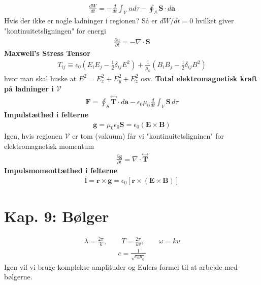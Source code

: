 \documentclass[a4paper]{article}
\begin{document}
    \begin{align*}
        \boxed{\frac{dW}{dt} = -\frac{d}{dt} \int _\mathcal{V} u d \tau  - \oint_{\mathcal{S} } \mathbf{S} \cdot d \mathbf{a}} \tag{8.11}
    \end{align*}
    Hvis der ikke er nogle ladninger i regionen? Så er \(dW / dt = 0\) hvilket giver "kontinuitetsligningen" for energi \begin{align*}
        \frac{\partial u}{\partial t} = - \nabla \cdot \mathbf{S} \tag{8.12}
    \end{align*} 
    \textbf{Maxwell's Stress Tensor}
    \begin{align*}
        T_{ij} \equiv \epsilon _0 \left( E_i E_j - \frac{1}{2} \delta_{ij} E^{2}\right) + \frac{1}{\mu _0}\left( B_i B_j - \frac{1}{2} \delta_{ij} B^{2}\right) \tag{8.17}
    \end{align*} 
    hvor man skal huske at \(E^{2} = E_x ^{2} + E_y ^{2} + E_z ^{2} \) osv. 
    \textbf{Total elektromagnetisk kraft på ladninger i \(\mathcal{V} \)} 
    \begin{align*}
        \boxed{\mathbf{F} = \oint_S \overset{\leftrightarrow}{\mathbf{T}} \cdot d\mathbf{a} 
        - \epsilon_0 \mu_0 \frac{d}{dt} \int_V \mathbf{S} \, d\tau} \tag{8.20}
    \end{align*}
    \textbf{Impulstæthed i felterne} \begin{align*}
        \boxed{\mathbf{g} = \mu _0 \epsilon _0 \mathbf{S} = \epsilon _0 \left( \mathbf{E} \times \mathbf{B} \right) } \tag{8.29}
    \end{align*}  
    Igen, hvis regionen \(\mathcal{V}\) er tom (vakuum) får vi "kontinuitetsligninen" for elektromagnetisk momentum \begin{align*}
        \frac{\partial \mathbf{g}}{\partial t} = \nabla \cdot \overset{\leftrightarrow}{\mathbf{T}} \tag{8.30}
    \end{align*}  
    \textbf{Impulsmomenttæthed i felterne}
    \begin{align*}
        \mathbf{l} = \mathbf{r} \times \mathbf{g} = \epsilon _0 \left[ \mathbf{r} \times (\mathbf{E}\times \mathbf{B}) \right] \tag{8.33}
    \end{align*}       
    
    \newpage
    \section{Kap. 9: Bølger}
    \begin{align*}
        \lambda = \frac{2\pi}{k}, \qquad T = \frac{2\pi}{k v}, \qquad \boxed{\omega = kv}
    \end{align*}
    \begin{align*}
        \boxed{c = \frac{1}{\sqrt{\epsilon _0 \mu _0} }}
    \end{align*}
    Igen vil vi bruge komplekse amplituder og Eulers formel til at arbejde med bølgerne.
\end{document}
